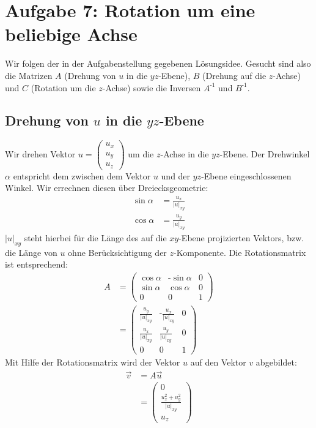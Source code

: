 \documentclass[a4paper]{scrartcl}
\begin{document}
\section*{Aufgabe 7: Rotation um eine beliebige Achse}
Wir folgen der in der Aufgabenstellung gegebenen Lösungsidee. Gesucht sind also die Matrizen $A$ (Drehung von $u$ in die $yz$-Ebene), $B$ (Drehung auf die $z$-Achse) und $C$ (Rotation um die $z$-Achse) sowie die Inversen $A^{\text{-}1}$ und $B^{\text{-}1}$.

\subsection*{Drehung von $u$ in die $yz$-Ebene}
Wir drehen Vektor $u=\begin{pmatrix} u_x \\ u_y \\ u_z \end{pmatrix}$ um die $z$-Achse in die $yz$-Ebene. Der Drehwinkel $\alpha$ entspricht dem zwischen dem Vektor $u$ und der $yz$-Ebene eingeschlossenen Winkel. Wir errechnen diesen über Dreiecksgeometrie:
\begin{align*}
\sin\alpha & = \frac{u_x}{\left|u\right|_{xy}} \\
\cos\alpha & = \frac{u_y}{\left|u\right|_{xy}}
\end{align*}
$\left|u\right|_{xy}$ steht hierbei für die Länge des auf die $xy$-Ebene projizierten Vektors, bzw. die Länge von $u$ ohne Berücksichtigung der $z$-Komponente. Die Rotationsmatrix ist entsprechend:
\begin{align*}
A & = \begin{pmatrix} \cos\alpha & \text{-}\sin\alpha & 0 \\ \sin\alpha & \cos\alpha & 0 \\ 0 & 0 & 1 \end{pmatrix}
\\
& = \begin{pmatrix} 
\frac{u_y}{\left|u\right|_{xy}} & \text{-} \frac{u_x}{\left|u\right|_{xy}} & 0 \\ 
\frac{u_x}{\left|u\right|_{xy}} & \frac{u_y}{\left|u\right|_{xy}} & 0 \\ 
0 & 0 & 1
\end{pmatrix}
\end{align*}
Mit Hilfe der Rotationsmatrix wird der Vektor $u$ auf den Vektor $v$ abgebildet:
\begin{align*}
\vec{v} & = A\vec{u} \\
& = \begin{pmatrix} 0 \\ \frac{u_x^2 + u_y^2}{\left|u\right|_{xy}} \\ u_z\end{pmatrix}
\end{align*}
\end{document}
